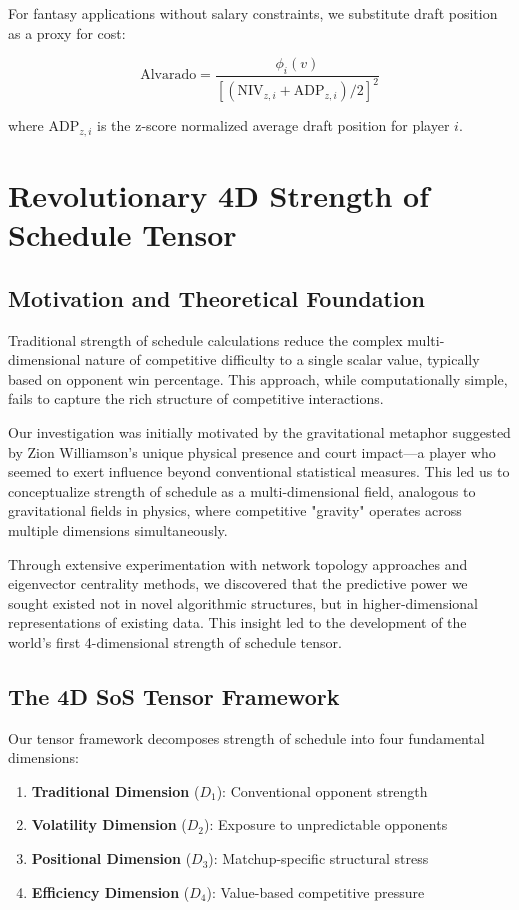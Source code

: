 \documentclass[11pt]{article}
\begin{document}
For fantasy applications without salary constraints, we substitute draft position as a proxy for cost:

\begin{equation}
\text{Alvarado} = \frac{\phi_i(v)}{[(\text{NIV}_{z,i} + \text{ADP}_{z,i})/2]^2}
\end{equation}

where $\text{ADP}_{z,i}$ is the z-score normalized average draft position for player $i$.

\section{Revolutionary 4D Strength of Schedule Tensor}

\subsection{Motivation and Theoretical Foundation}

Traditional strength of schedule calculations reduce the complex multi-dimensional nature of competitive difficulty to a single scalar value, typically based on opponent win percentage. This approach, while computationally simple, fails to capture the rich structure of competitive interactions.

Our investigation was initially motivated by the gravitational metaphor suggested by Zion Williamson's unique physical presence and court impact—a player who seemed to exert influence beyond conventional statistical measures. This led us to conceptualize strength of schedule as a multi-dimensional field, analogous to gravitational fields in physics, where competitive "gravity" operates across multiple dimensions simultaneously.

Through extensive experimentation with network topology approaches and eigenvector centrality methods, we discovered that the predictive power we sought existed not in novel algorithmic structures, but in higher-dimensional representations of existing data. This insight led to the development of the world's first 4-dimensional strength of schedule tensor.

\subsection{The 4D SoS Tensor Framework}

Our tensor framework decomposes strength of schedule into four fundamental dimensions:

\begin{enumerate}
    \item \textbf{Traditional Dimension} ($D_1$): Conventional opponent strength
    \item \textbf{Volatility Dimension} ($D_2$): Exposure to unpredictable opponents
    \item \textbf{Positional Dimension} ($D_3$): Matchup-specific structural stress
    \item \textbf{Efficiency Dimension} ($D_4$): Value-based competitive pressure
\end{enumerate}
\end{document}
